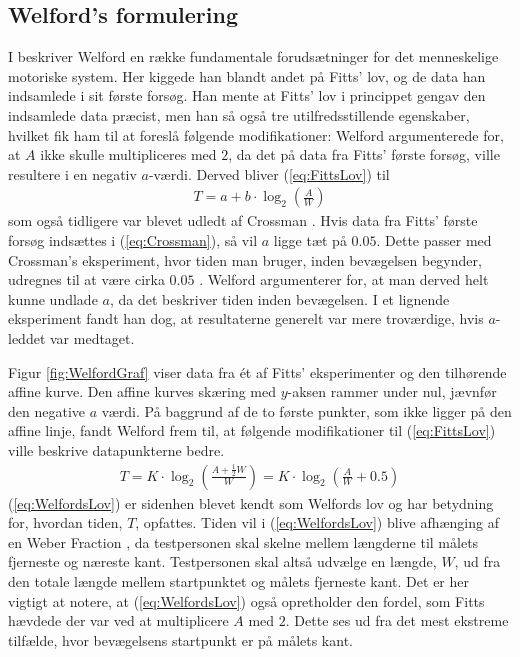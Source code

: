 \subsection*{Welford's formulering}

I \cite{welford1968} beskriver Welford en række fundamentale forudsætninger for det menneskelige motoriske system. Her kiggede han blandt andet på Fitts' lov, og de data han indsamlede i sit første forsøg. Han mente at Fitts' lov i princippet gengav den indsamlede data præcist, men han så også tre utilfredsstillende egenskaber, hvilket fik ham til at foreslå følgende modifikationer:
Welford argumenterede for, at $A$ ikke skulle multipliceres med $2$, da det på data fra Fitts' første forsøg, ville resultere i en negativ $a$-værdi. Derved bliver (\ref{eq:FittsLov}) til
\begin{align}
\label{eq:Crossman}
T = a + b \cdot \log_2\left(\frac{A}{W}\right)
\end{align}
som også tidligere var blevet udledt af Crossman \cite{crossman1957}. Hvis data fra Fitts' første forsøg indsættes i (\ref{eq:Crossman}), så vil $a$ ligge tæt på $0.05$. Dette passer med Crossman's eksperiment, hvor tiden man bruger, inden bevægelsen begynder, udregnes til at være cirka $0.05$ \cite{crossman1957}. Welford argumenterer for, at man derved helt kunne undlade $a$, da det beskriver tiden inden bevægelsen. I et lignende eksperiment \cite{welford1958} fandt han dog, at resultaterne generelt var mere troværdige, hvis $a$-leddet var medtaget.

Figur \ref{fig:WelfordGraf} viser data fra ét af Fitts' eksperimenter og den tilhørende affine kurve. Den affine kurves skæring med $y$-aksen rammer under nul, jævnfør den negative $a$ værdi. På baggrund af de to første punkter, som ikke ligger på den affine linje, fandt Welford frem til, at følgende modifikationer til (\ref{eq:FittsLov}) ville beskrive datapunkterne bedre.
\begin{align}\label{eq:WelfordsLov}
T = K \cdot \log_2\left(\frac{A + \frac{1}{2}W}{W}\right) = K \cdot \log_2\left(\frac{A}{W} + 0.5\right)
\end{align}
(\ref{eq:WelfordsLov}) er sidenhen blevet kendt som Welfords lov og har betydning for, hvordan tiden, $T$, opfattes. Tiden vil i (\ref{eq:WelfordsLov}) blive afhænging af en Weber Fraction \cite{welford1958}, da testpersonen skal skelne mellem længderne til målets fjerneste og næreste kant. Testpersonen skal altså udvælge en længde, $W$, ud fra den totale længde mellem startpunktet og målets fjerneste kant. Det er her vigtigt at notere, at (\ref{eq:WelfordsLov}) også opretholder den fordel, som Fitts hævdede der var ved at multiplicere $A$ med $2$. Dette ses ud fra det mest ekstreme tilfælde, hvor bevægelsens startpunkt er på målets kant.

